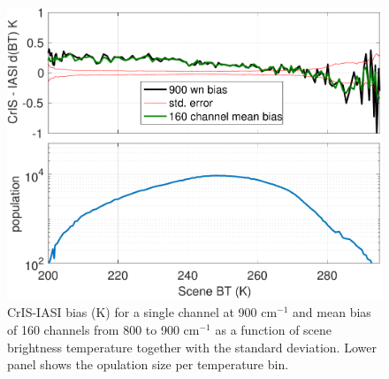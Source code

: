 \documentclass[twocolumn,10pt]{article}
\begin{document}


\begin{figure}[htb]
\centering
\includegraphics[width=\linewidth]{./figs/ic_jpl_sno_bias_stderr_vs_scene_lw_chans.pdf}
\caption{
  CrIS-IASI bias (K) for a single channel at 900 cm$^{-1}$ and mean bias of 160 channels from 800 to 900 cm$^{-1}$ as a function of scene brightness temperature together with the standard deviation. Lower panel shows the opulation size per temperature bin.}
\label{fig:X8}
\end{figure}
\end{document}
